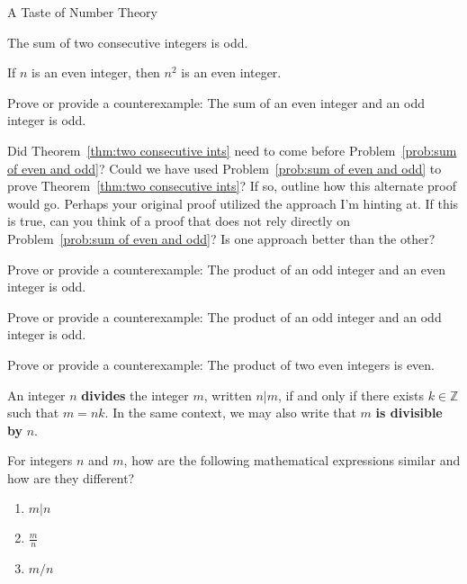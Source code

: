 \begin{section}{A Taste of Number Theory}
\begin{theorem}\label{thm:two consecutive ints}
The sum of two consecutive integers is odd.
\end{theorem}

\begin{theorem}\label{thm:n even implies n^2 even}
If $n$ is an even integer, then $n^2$ is an even integer.
\end{theorem}

\begin{problem}\label{prob:sum of even and odd}
Prove or provide a counterexample:  The sum of an even integer and an odd integer is odd.
\end{problem}

\begin{problem}
Did Theorem~\ref{thm:two consecutive ints} need to come before Problem~\ref{prob:sum of even and odd}?  Could we have used Problem~\ref{prob:sum of even and odd} to prove Theorem~\ref{thm:two consecutive ints}?  If so, outline how this alternate proof would go.  Perhaps your original proof utilized the approach I'm hinting at.  If this is true, can you think of a proof that does not rely directly on Problem~\ref{prob:sum of even and odd}?  Is one approach better than the other?
\end{problem}

\begin{problem}
Prove or provide a counterexample: The product of an odd integer and an even integer is odd.
\end{problem}

\begin{problem}
Prove or provide a counterexample: The product of an odd integer and an odd integer is odd.
\end{problem}

\begin{problem}
Prove or provide a counterexample: The product of two even integers is even.
\end{problem}

\begin{definition}
An integer $n$ \textbf{divides} the integer $m$, written $n|m$, if and only if there exists $k\in\mathbb{Z}$ such that $m=nk$. In the same context, we may also write that $m$ \textbf{is divisible by} $n$.
\end{definition}

\begin{problem}
For integers $n$ and $m$, how are the following mathematical expressions similar and how are they different?
\begin{enumerate}[label=\textrm{(\alph*)}]
\item $m|n$
\item $\displaystyle \frac{m}{n}$
\item $m/n$
\end{enumerate}
\end{problem}


\end{section}
